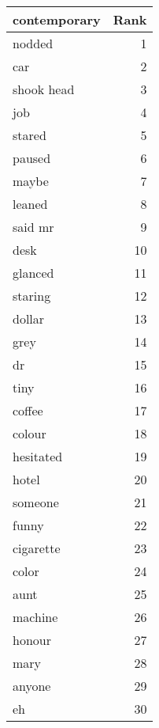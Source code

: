 \begin{table}
\label{tab:contemporary_terms}
\begin{tabular}{lr}
\toprule
contemporary & Rank \\
\midrule
nodded & 1 \\
car & 2 \\
shook head & 3 \\
job & 4 \\
stared & 5 \\
paused & 6 \\
maybe & 7 \\
leaned & 8 \\
said mr & 9 \\
desk & 10 \\
glanced & 11 \\
staring & 12 \\
dollar & 13 \\
grey & 14 \\
dr & 15 \\
tiny & 16 \\
coffee & 17 \\
colour & 18 \\
hesitated & 19 \\
hotel & 20 \\
someone & 21 \\
funny & 22 \\
cigarette & 23 \\
color & 24 \\
aunt & 25 \\
machine & 26 \\
honour & 27 \\
mary & 28 \\
anyone & 29 \\
eh & 30 \\
\bottomrule
\end{tabular}
\end{table}
